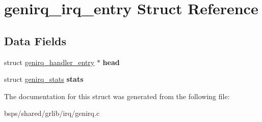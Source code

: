 \hypertarget{structgenirq__irq__entry}{}\section{genirq\+\_\+irq\+\_\+entry Struct Reference}
\label{structgenirq__irq__entry}
\subsection*{Data Fields}
\begin{DoxyCompactItemize}
\item 
\mbox{\label{structgenirq__irq__entry_af791391e407829bf798057f54719ea8f}} 
struct \mbox{\hyperlink{structgenirq__handler__entry}{genirq\+\_\+handler\+\_\+entry}} $\ast$ {\bfseries head}
\item 
\mbox{\label{structgenirq__irq__entry_a7aa57c4a7d42c9ce7abddc33069584ef}} 
struct \mbox{\hyperlink{structgenirq__stats}{genirq\+\_\+stats}} {\bfseries stats}
\end{DoxyCompactItemize}


The documentation for this struct was generated from the following file\+:\begin{DoxyCompactItemize}
\item 
bsps/shared/grlib/irq/genirq.\+c\end{DoxyCompactItemize}
